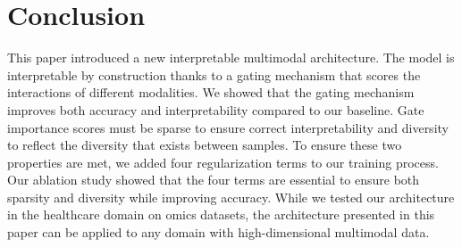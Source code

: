 \documentclass[../main.tex]{subfiles}
\begin{document}
\section{Conclusion}
 This paper introduced a new interpretable multimodal architecture.
 The model is interpretable by construction thanks to a gating mechanism that scores the interactions of different modalities.
 We showed that the gating mechanism improves both accuracy and interpretability compared to our baseline.
 Gate importance scores must be sparse to ensure correct interpretability and diversity to reflect the diversity that exists between samples.
 To ensure these two properties are met, we added four regularization terms to our training process.
 Our ablation study showed that the four terms are essential to ensure both sparsity and diversity while improving accuracy.
 While we tested our architecture in the healthcare domain on omics datasets, the architecture presented in this paper can be applied to any domain with high-dimensional multimodal data.
\end{document}
